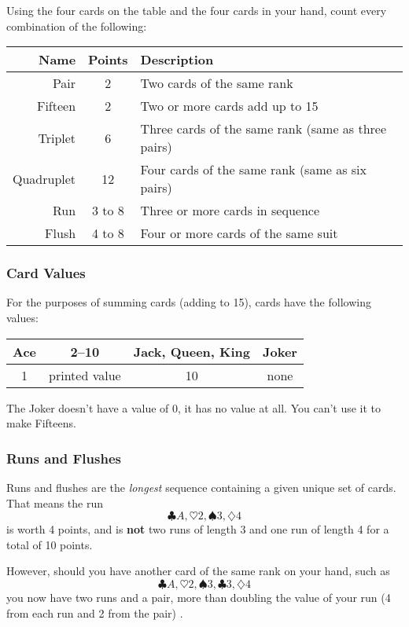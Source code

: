 \documentclass{article}
\begin{document}
Using the four cards on the table and the four cards in your hand, count every combination of the following:

\begin{center}
    \begin{tabular}{r|c|l}
        Name & Points & Description\\\hline
        Pair & 2 & Two cards of the same rank\\
        Fifteen & 2 & Two or more cards add up to 15\\
        Triplet & 6 & Three cards of the same rank (same as three pairs)\\
        Quadruplet & 12 & Four cards of the same rank (same as six pairs)\\
        Run & 3 to 8 & Three or more cards in sequence\\
        Flush & 4 to 8 & Four or more cards of the same suit\\
    \end{tabular}
\end{center}

\subsubsection{Card Values}
For the purposes of summing cards (adding to 15), cards have the following values:
\begin{center}
    \begin{tabular}{c|c|c|c}
        Ace & 2--10 & Jack, Queen, King & Joker\\\hline
        1 & printed value & 10 & none\\ 
    \end{tabular}
\end{center}
\note The Joker doesn't have a value of 0, it has no value at all. You can't use it to make Fifteens.

\subsubsection{Runs and Flushes}
Runs and flushes are the \textit{longest} sequence containing a given unique set of cards. That means the run \[\clubsuit A, \heartsuit 2, \spadesuit 3, \diamondsuit 4\] is worth 4 points, and is \textbf{not} two runs of length 3 and one run of length 4 for a total of 10 points.

However, should you have another card of the same rank on your hand, such as \[\clubsuit A, \heartsuit 2, \spadesuit 3, \clubsuit 3, \diamondsuit 4\] you now have two runs and a pair, more than doubling the value of your run (4 from each run and 2 from the pair) .
\end{document}
